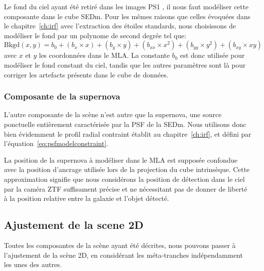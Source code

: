 \documentclass[../main/main.tex]{subfiles}
\begin{document}
Le fond du ciel ayant été retiré dans les images PS1 \citep{Waters2020},
il nous faut modéliser cette composante dans le cube SEDm. Pour les
mêmes raisons que celles évoquées
dans le chapitre~\ref{ch:irf} avec l'extraction des étoiles standards,
nous choisissons de modéliser le fond par un polynome de second degrée
tel que:
\begin{equation}
  \label{eq:backgroundcurved2}
  \text{Bkgd}(x,y) = b_{0} + (b_{x}\times x)+(b_{y}\times y) + (b_{xx}\times x^{2})+ (b_{yy}\times y^{2})+(b_{xy}\times xy)
\end{equation}
avec $x$ et $y$ les coordonnées dans le MLA. La constante $b_{0}$ est
donc utilisée pour modéliser le fond constant du ciel, tandis que les autres
paramètres sont là pour corriger les artefacts présents dans le cube de données.

\subsubsection{Composante de la supernova}

L'autre composante de la scène n'est autre que la supernova, une source
ponctuelle entièrement caractérisée par la PSF de la SEDm. Nous
utilisons donc bien évidemment le profil radial contraint établit au
chapitre~\ref{ch:irf}, et défini par l'équation~\ref{eq:psfmodelconstraint}.

La position de la
supernova à modéliser dans le MLA est supposée confondue avec la position
d'ancrage utilisée lors de la projection du cube intrinsèque. Cette
approximation signifie que nous considérons la position de détection
dans le ciel par la caméra ZTF suffisament précise et ne nécessitant pas de
donner de liberté à la position relative entre la galaxie et l'objet
détecté. 

\subsection{Ajustement de la scene 2D}

Toutes les composantes de la scène ayant été décrites, nous pouvons
passer à l'ajustement de la scène 2D, en considérant les méta-tranches
indépendamment les unes des autres.
\end{document}
